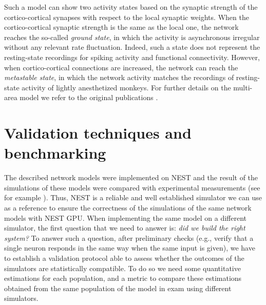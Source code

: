 \documentclass[a4paper, 12pt, twoside, openright]{book}
\begin{document}
Such a model can show two activity states based on the synaptic strength of the cortico-cortical synapses with respect to the local synaptic weights. When the cortico-cortical synaptic strength is the same as the local one, the network reaches the so-called \textit{ground state}, in which the activity is asynchronous irregular without any relevant rate fluctuation. Indeed, such a state does not represent the resting-state recordings for spiking activity and functional connectivity. However, when cortico-cortical connections are increased, the network can reach the \textit{metastable state}, in which the network activity matches the recordings of resting-state activity of lightly anesthetized monkeys.
For further details on the multi-area model we refer to the original publications \cite{Schmidt2018, Schmidt2018b}.

\section{Validation techniques and benchmarking}
The described network models were implemented on NEST and the result of the simulations of these models were compared with experimental measurements (see for example \cite{Potjans2012,Schmidt2018}). Thus, NEST is a reliable and well established simulator we can use as a reference to ensure the correctness of the simulations of the same network models with NEST GPU. When implementing the same model on a different simulator, the first question that we need to answer is: \textit{did we build the right system?}
To answer such a question, after preliminary checks (e.g., verify that a single neuron responds in the same way when the same input is given), we have to establish a validation protocol able to assess whether the outcomes of the simulators are statistically compatible. To do so we need some quantitative estimations for each population, and a metric to compare these estimations obtained from the same population of the model in exam using different simulators.
\end{document}
